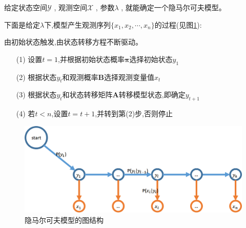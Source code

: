 \documentclass[UTF8,a4paper]{ctexart}%
\begin{document}
            给定状态空间$\mathcal{Y}$ , 观测空间$\mathcal{X}$ , 参数$\lambda$ , 就能确定一个隐马尔可夫模型。

            下面是给定$\lambda$下,模型产生观测序列$\{x_1, x_2, \cdots , x_n\}$的过程(见图\ref{generationOfHMM}):

            {\color{blue}
              由初始状态触发,由状态转移方程不断驱动。
            }
            \begin{itemize}
              \item [(1)] 设置$t=1$,并根据初始状态概率$\bm{\pi}$选择初始状态$y_1$
              \item [(2)] 根据状态$y_t$和观测概率$\bm{B}$选择观测变量值$x_t$
              \item [(3)] 根据状态$y_t$和状态转移矩阵$\bm{A}$转移模型状态,即确定$y_{t+1}$
              \item [(4)] 若$t<n$,设置$t=t+1$,并转到第(2)步,否则停止
            \end{itemize}

            \begin{figure}[!htbp]
              \centering
              \includegraphics[scale=0.4]{assets/jiqixuexi4_06c36.png}
              \caption{隐马尔可夫模型的图结构}
              \label{generationOfHMM}
            \end{figure}
\end{document}

